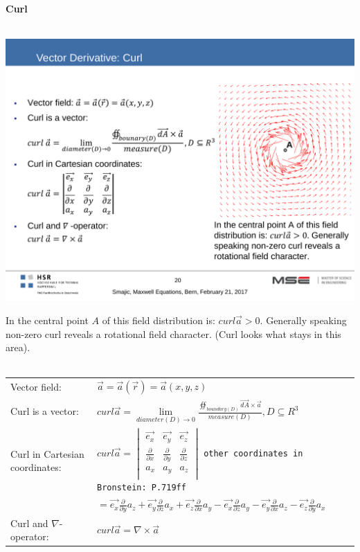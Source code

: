 \textbf{\\ \\ Curl\\ \\}
\begin{minipage}[lt]{5cm}
	\includegraphics[width=.8\textwidth]{./images/Curl.pdf}
\end{minipage}
\begin{minipage}[rt]{13cm}
	In the central point $A$ of this field distribution is: $curl \vec{a} > 0$. Generally speaking non-zero curl reveals a rotational field character. (Curl looks what stays in this area).\\ \\
	\begin{tabular}{ll}
		Vector field: & $\vec{a} = \vec{a}\left(\vec{r}\right) = \vec{a}\left(x,y,z\right)$\\
		Curl is a vector: & $curl \vec{a} = \lim\limits_{diameter\left(D\right)\rightarrow 0} \frac{\oiint_{boundary\left(D\right)} \vec{dA} \times \vec{a}}{measure\left(D\right)}, D\subseteq R^3$\\
		Curl in Cartesian coordinates: & $curl \vec{a} = 
		\begin{vmatrix}
			\vec{e_x} & \vec{e_y} & \vec{e_z} \\
			\frac{\partial}{\partial x} & \frac{\partial}{\partial y} & \frac{\partial}{\partial z} \\
			a_x & a_y & a_z \\
		\end{vmatrix}$ {\tiny \texttt{other coordinates in Bronstein: P.719ff}}\\
		& $= \vec{e_x}\frac{\partial}{\partial y}a_z +   		\vec{e_y}\frac{\partial}{\partial z}a_x +\vec{e_z}\frac{\partial}{\partial x}a_y - \vec{e_x}\frac{\partial}{\partial z}a_y - \vec{e_y}\frac{\partial}{\partial x}a_z - \vec{e_z}\frac{\partial}{\partial y}a_x$ \\
		Curl and $\nabla$-operator: & $curl \vec{a} = \nabla \times \vec{a}$\\
	\end{tabular}
\end{minipage}

